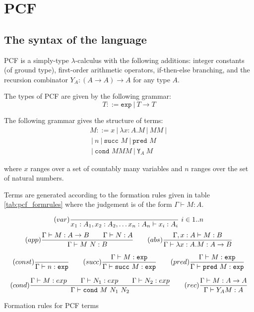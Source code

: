 \section{PCF}
\subsection{The syntax of the language}
PCF is a simply-type $\lambda$-calculus with the following
additions: integer constants  (of ground type), first-order
arithmetic operators, if-then-else branching, and the recursion
combinator $Y_A : (A\rightarrow A)\rightarrow A$ for any type $A$.

The types of PCF are given by the following grammar:
$$ T ::= \texttt{exp}\ |\ T \rightarrow T$$

The following grammar gives the structure of terms:
\begin{eqnarray*}
 M ::= x\ |\ \lambda x :A . M \ |\ M M \ |\ \\
\ |\ n \ |\ \texttt{succ } M \ |\  \texttt{pred } M \\
\ |\ \texttt{cond } M M M \ |\ \texttt{Y}_A\ M
\end{eqnarray*}

where $x$ ranges over a set of countably many variables and $n$
ranges over the set of natural numbers.

Terms are generated according to the formation rules given in table
\ref{tab:pcf_formrules} where the judgement is of the form $ \Gamma  \vdash M : A$.

\begin{table}[htbp]
$$ (var) \frac{\displaystyle }{x_1:A_1, x_2:A_2, \ldots x_n : A_n  \vdash x_i : A_i}\ i \in 1..n$$
$$ (app) \frac{\displaystyle \Gamma \vdash M : A\rightarrow B \qquad \Gamma \vdash N:A}{\Gamma \vdash M\ N : B}
\qquad (abs) \frac{\displaystyle \Gamma, x:A \vdash M : B}{\Gamma \vdash \lambda x :A . M : A\rightarrow B}$$

$$ (const) \frac{\displaystyle }{\Gamma \vdash n :\texttt{exp}}
\qquad (succ) \frac{\displaystyle \Gamma \vdash M:\texttt{exp} }{\Gamma \vdash \texttt{succ}\ M:\texttt{exp}}
\qquad (pred) \frac{\displaystyle \Gamma \vdash M:\texttt{exp} }{\Gamma \vdash \texttt{pred}\ M:\texttt{exp}}$$

$$
(cond) \frac{\displaystyle \Gamma \vdash M : exp \qquad \Gamma \vdash N_1 : exp \qquad \Gamma \vdash N_2 : exp }{\Gamma \vdash \texttt{cond}\ M\ N_1\ N_2}
\qquad  (rec) \frac{\displaystyle \Gamma \vdash M : A\rightarrow A }{ \Gamma \vdash Y_A M : A}$$

\caption{Formation rules for PCF terms}
\label{tab:pcf_formrules}
\end{table}

